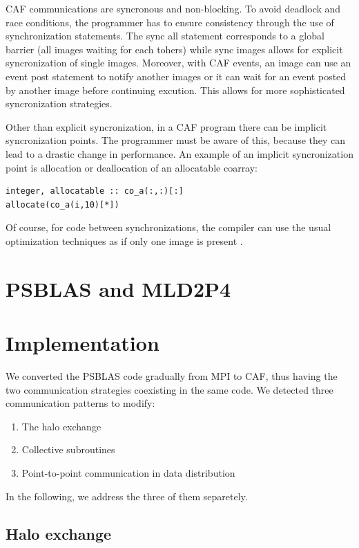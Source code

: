 \documentclass{IOS-Book-Article}
\begin{document}
CAF communications are syncronous and non-blocking. 
To avoid deadlock and race conditions, the programmer has to ensure consistency through the use of synchronization statements.
The sync all statement corresponds to a global barrier (all images waiting for each tohers) while sync images allows for explicit syncronization of single images. Moreover, with CAF events, an image can use an event post statement to notify another images or it can wait for an event posted by another image before continuing excution. This allows for more sophisticated syncronization strategies.  

Other than explicit syncronization, in a CAF program there can be implicit syncronization points. The programmer must be aware of this, because they can lead to a drastic change in performance.
An example of an implicit syncronization point is allocation or deallocation of an allocatable coarray:

\begin{lstlisting}
integer, allocatable :: co_a(:,:)[:]
allocate(co_a(i,10)[*])
\end{lstlisting}

Of course, for code between synchronizations, the compiler can use the usual optimization techniques as if only one image is present \cite{r6}.

\section{PSBLAS and MLD2P4}

\section{Implementation}
We converted the PSBLAS code gradually from MPI to CAF, thus having the two communication strategies coexisting in the same code. 
We detected three communication patterns to modify:

\begin{enumerate}
\item The halo exchange
\item Collective subroutines
\item Point-to-point communication in data distribution
\end{enumerate}

In the following, we address the three of them separetely.

\subsection{Halo exchange}
\end{document}
